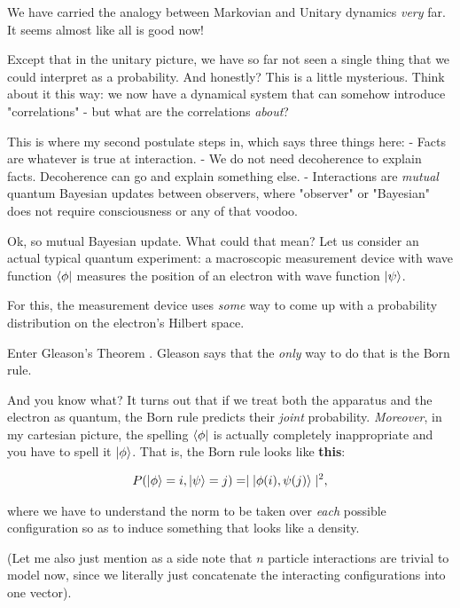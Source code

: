 \documentclass{article}
\begin{document}
We have carried the analogy between Markovian and Unitary dynamics \textit{very} far. It seems almost like all is good now!

Except that in the unitary picture, we have so far not seen a single thing that we could interpret as a probability. And honestly? This is a little mysterious. Think about it this way: we now have a dynamical system that can somehow introduce "correlations" - but what are the correlations \textit{about}?

This is where my second postulate steps in, which says three things here:
- Facts are whatever is true at interaction.
- We do not need decoherence to explain facts. Decoherence can go and explain something else.
- Interactions are \textit{mutual} quantum Bayesian updates between observers, where "observer" or "Bayesian" does not require consciousness or any of that voodoo.

Ok, so mutual Bayesian update. What could that mean? Let us consider an actual typical quantum experiment: a macroscopic measurement device with wave function $\bra{\phi}$ measures the position of an electron with wave function $\ket{\psi}$.

For this, the measurement device uses \textit{some} way to come up with a probability distribution on the electron's Hilbert space.

Enter Gleason's Theorem \cite{Gleason1957}. Gleason says that the \textit{only} way to do that is the Born rule.

And you know what? It turns out that if we treat both the apparatus and the electron as quantum, the Born rule predicts their \textit{joint} probability. \textit{Moreover}, in my cartesian picture, the spelling $\bra{\phi}$ is actually completely inappropriate and you have to spell it $\ket{\phi}$. That is, the Born rule looks like \textbf{this}:

\begin{mdframed}
\begin{align*}
P(\ket{\phi}=i,\ket{\psi}=j) = \mid \ket{\phi(i), \psi(j)} \mid^2,
\end{align*}
\end{mdframed}

where we have to understand the norm to be taken over \textit{each} possible configuration so as to induce something that looks like a density.

(Let me also just mention as a side note that $n$ particle interactions are trivial to model now, since we literally just concatenate the interacting configurations into one vector).
\end{document}
